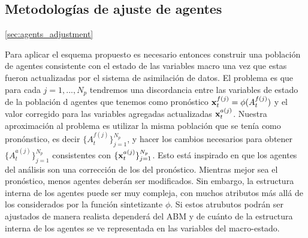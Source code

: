 \subsection{Metodologías de ajuste de agentes} \ref{sec:agents_adjustment}

Para aplicar el esquema propuesto es necesario entonces construir una población de agentes consistente con el estado de las variables macro una vez que estas fueron actualizadas por el sistema de asimilación de datos. El problema es que para cada $j = 1, ..., N_p$ tendremos una discordancia entre las variables de estado de la población d agentes que tenemos como pronóstico $\mathbf{x}_t^{f(j)} = \phi (A_t^{f(j)})$ y el valor corregido para las variables agregadas actualizadas $\mathbf{x}_t^{a(j)}$. Nuestra aproximación al problema es utilizar la misma población que se tenía como pronónstico, es decir $\{A_t^{f(j)}\}_{j=1}^{N_p}$, y hacer los cambios necesarios para obtener $\{A_t^{a(j)}\}_{j=1}^{N_p}$ consistentes con $\{\mathbf{x}_t^{a(j)}\}_{j=1}^{N_p}$. Esto está inspirado en que los agentes del análisis son una corrección de los del pronóstico. Mientras mejor sea el pronóstico, menos agentes deberán ser modificados. Sin embargo, la estructura interna de los agentes puede ser muy compleja, con muchos atributos más allá de los considerados por la función sintetizante $\phi$. Si estos atrubutos podrán ser ajustados de manera realista dependerá del ABM y de cuánto de la estructura interna de los agentes se ve representada en las variables del macro-estado.

